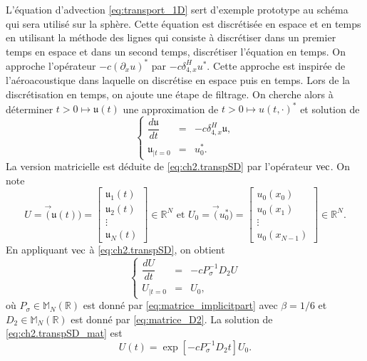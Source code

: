 L'équation d'advection \eqref{eq:transport_1D} sert d'exemple prototype au schéma qui sera utilisé sur la sphère. Cette équation est discrétisée en espace et en temps en utilisant la méthode des lignes qui consiste à discrétiser dans un premier temps en espace et dans un second temps, discrétiser l'équation en temps. On approche l'opérateur $-c (\partial_x u)^*$ par $- c \delta_{4,x}^H u^*$. Cette approche est inspirée de l'aéroacoustique dans laquelle on discrétise en espace puis en temps. Lors de la discrétisation en temps, on ajoute une étape de filtrage.
On cherche alors à déterminer $t > 0 \mapsto \mathfrak{u}(t)$ une approximation de $t>0  \mapsto u(t,\cdot)^*$ et solution de 
\begin{equation}
\left\lbrace
\begin{array}{rcl}
\dfrac{d \mathfrak{u}}{dt} & = & - c \delta_{4,x}^H \mathfrak{u}, \\
\mathfrak{u}_{|t=0} & = & u_0^*.
\end{array}
\right.
\label{eq:ch2.transpSD}
\end{equation}
La version matricielle est déduite de \eqref{eq:ch2.transpSD} par l'opérateur $\vec$. On note
\begin{equation}
U = \vec (\mathfrak{u}(t)) = \begin{bmatrix}
\mathfrak{u}_1(t) \\
\mathfrak{u}_2(t) \\
\vdots \\
\mathfrak{u}_N(t)
\end{bmatrix} \in \mathbb{R}^N \text{ et } U_0 = \vec (u^*_0 ) = \begin{bmatrix}
u_0(x_0) \\
u_0(x_1) \\
\vdots \\
u_0(x_{N-1})
\end{bmatrix} \in \mathbb{R}^N.
\end{equation}
En appliquant $\vec$ à \eqref{eq:ch2.transpSD}, on obtient
\begin{equation}
\left\lbrace
\begin{array}{rcl}
\dfrac{d U}{dt} & = & - c P^{-1}_{\sigma} D_2 U \\
U_{|t=0} & = & U_0,
\end{array}
\right.
\label{eq:ch2.transpSD_mat}
\end{equation}
où $P_{\sigma} \in \mathbb{M}_N(\mathbb{R})$ est donné par \eqref{eq:matrice_implicitpart} avec $\beta = 1/6$ et $D_2 \in \mathbb{M}_N(\mathbb{R})$ est donné par \eqref{eq:matrice_D2}.
La solution de \eqref{eq:ch2.transpSD_mat} est
\begin{equation}
U(t) = \exp\left[ - c P^{-1}_{\sigma} D_2 t\right] U_0.
\label{eq:u(t)matriciel_transp}
\end{equation}


